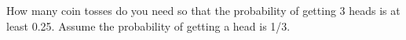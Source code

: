 How many coin tosses do you need so that the probability of
getting 3 heads is at least 0.25. 
Assume the probability of getting a head is 1/3.
